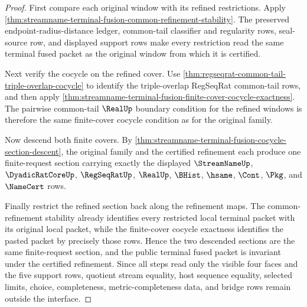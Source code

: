 \begin{proof}
First compare each original window with its refined restrictions. Apply
\autoref{thm:streamname-terminal-fusion-common-refinement-stability}. The
preserved endpoint-radius-distance ledger, common-tail classifier and
regularity rows, seal-source row, and displayed support rows make every
restriction read the same terminal fused packet as the original window from
which it is certified.

Next verify the cocycle on the refined cover. Use
\autoref{thm:regseqrat-common-tail-triple-overlap-cocycle} to identify the
triple-overlap RegSeqRat common-tail rows, and then apply
\autoref{thm:streamname-terminal-fusion-finite-cover-cocycle-exactness}. The
pairwise common-tail $\RealUp$ boundary condition for the refined windows is
therefore the same finite-cover cocycle condition as for the original family.

Now descend both finite covers. By
\autoref{thm:streamname-terminal-fusion-cocycle-section-descent}, the original
family and the certified refinement each produce one finite-request section
carrying exactly the displayed $\StreamNameUp$, $\DyadicRatCoreUp$,
$\RegSeqRatUp$, $\RealUp$, $\BHist$, $\hsame$, $\Cont$, $\Pkg$, and
$\NameCert$ rows.

Finally restrict the refined section back along the refinement maps. The
common-refinement stability already identifies every restricted local terminal
packet with its original local packet, while the finite-cover cocycle
exactness identifies the pasted packet by precisely those rows. Hence the two
descended sections are the same finite-request section, and the public
terminal fused packet is invariant under the certified refinement. Since all
steps read only the visible four faces and the five support rows, quotient
stream equality, host sequence equality, selected limits, choice,
completeness, metric-completeness data, and bridge rows remain outside the
interface.
\end{proof}

